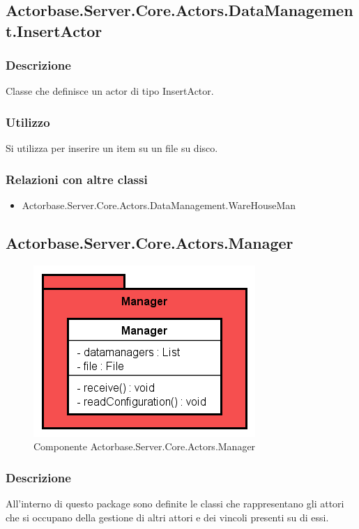 \documentclass[a4paper]{article}
\begin{document}
		\subsection{Actorbase.Server.Core.Actors.DataManagement.InsertActor}
			\subsubsection{Descrizione}
				Classe che definisce un actor di tipo InsertActor.
			\subsubsection{Utilizzo}
				Si utilizza per inserire un item su un file su disco. 
			\subsubsection{Relazioni con altre classi}
			\begin{itemize}
				\item Actorbase.Server.Core.Actors.DataManagement.WareHouseMan
			\end{itemize}

		\subsection{Actorbase.Server.Core.Actors.Manager}
			\begin{figure} [H]
			\centering
			\includegraphics[scale=0.65]{Server/Package/ManagerLevel.png}
			\caption{Componente Actorbase.Server.Core.Actors.Manager}
			\end{figure}
			\subsubsection{Descrizione}
				All'interno di questo package sono definite le classi che rappresentano gli attori che si occupano della gestione di altri attori e dei vincoli presenti su di essi.
\end{document}
